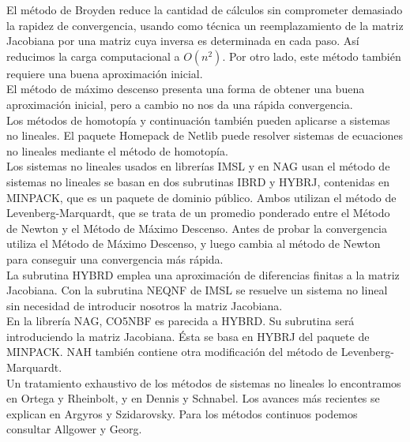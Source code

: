 El método de Broyden reduce la cantidad de cálculos sin comprometer demasiado la rapidez de convergencia, usando como técnica un reemplazamiento de la matriz Jacobiana por una matriz cuya inversa es determinada en cada paso. Así reducimos la carga computacional a $O(n^2)$. Por otro lado, este método también requiere una buena aproximación inicial. \\

El método de máximo descenso presenta una forma de obtener una buena aproximación inicial, pero a cambio no nos da una rápida convergencia. \\

Los métodos de homotopía y continuación también pueden aplicarse a sistemas no lineales. El paquete Homepack de Netlib puede resolver sistemas de ecuaciones no lineales mediante el método de homotopía. \\

Los sistemas no lineales usados en librerías IMSL y en NAG usan el método de sistemas no lineales se basan en dos subrutinas IBRD y HYBRJ, contenidas en MINPACK, que es un paquete de dominio público. Ambos utilizan el método de Levenberg-Marquardt, que se trata de un promedio ponderado entre el Método de Newton y el Método de Máximo Descenso. Antes de probar la convergencia utiliza el Método de Máximo Descenso, y luego cambia al método de Newton para conseguir una convergencia más rápida. \\

La subrutina HYBRD emplea una aproximación de diferencias finitas a la matriz Jacobiana. Con la subrutina NEQNF de IMSL se resuelve un sistema no lineal sin necesidad de introducir nosotros la matriz Jacobiana. \\

En la librería NAG, CO5NBF es parecida a HYBRD. Su subrutina será introduciendo la matriz Jacobiana. Ésta se basa en HYBRJ del paquete de MINPACK. NAH también contiene otra modificación del método de Levenberg-Marquardt.\\

Un tratamiento exhaustivo de los métodos de sistemas no lineales lo encontramos en Ortega y Rheinbolt, y en Dennis y Schnabel. Los avances más recientes se explican en Argyros y Szidarovsky. Para los métodos continuos podemos consultar Allgower y Georg.










